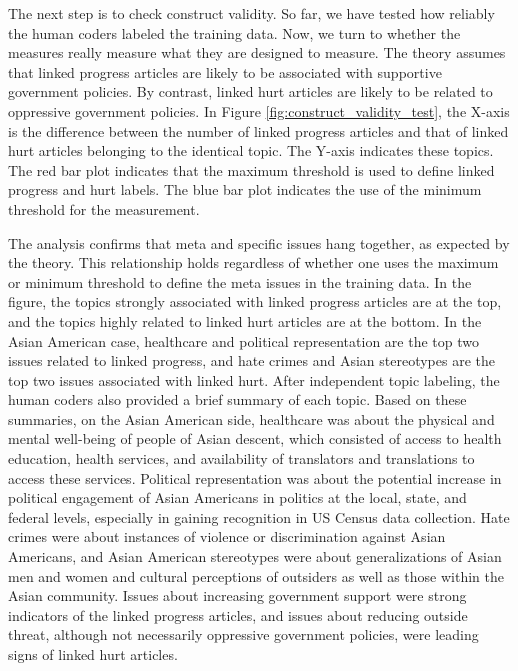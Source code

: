\documentclass[12 pt]{article}
\begin{document}
The next step is to check construct validity. So far, we have tested how reliably the human coders labeled the training data. Now, we turn to whether the measures really measure what they are designed to measure. The theory assumes that linked progress articles are likely to be associated with supportive government policies. By contrast, linked hurt articles are likely to be related to oppressive government policies. In Figure \ref{fig:construct_validity_test}, the X-axis is the difference between the number of linked progress articles and that of linked hurt articles belonging to the identical topic. The Y-axis indicates these topics. The red bar plot indicates that the maximum threshold is used to define linked progress and hurt labels. The blue bar plot indicates the use of the minimum threshold for the measurement. 

The analysis confirms that meta and specific issues hang together, as expected by the theory. This relationship holds regardless of whether one uses the maximum or minimum threshold to define the meta issues in the training data. In the figure, the topics strongly associated with linked progress articles are at the top, and the topics highly related to linked hurt articles are at the bottom. In the Asian American case, healthcare and political representation are the top two issues related to linked progress, and hate crimes and Asian stereotypes are the top two issues associated with linked hurt. After independent topic labeling, the human coders also provided a brief summary of each topic. Based on these summaries, on the Asian American side, healthcare was about the physical and mental well-being of people of Asian descent, which consisted of access to health education, health services, and availability of translators and translations to access these services. Political representation was about the potential increase in political engagement of Asian Americans in politics at the local, state, and federal levels, especially in gaining recognition in US Census data collection. Hate crimes were about instances of violence or discrimination against Asian Americans, and Asian American stereotypes were about generalizations of Asian men and women and cultural perceptions of outsiders as well as those within the Asian community. Issues about increasing government support were strong indicators of the linked progress articles, and issues about reducing outside threat, although not necessarily oppressive government policies, were leading signs of linked hurt articles. 
\end{document}
